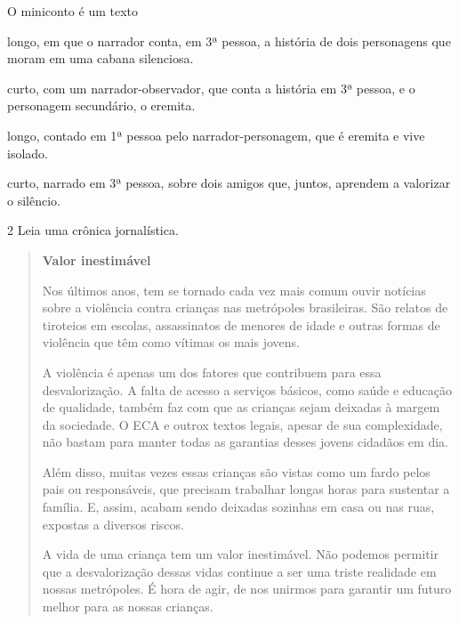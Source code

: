 O miniconto é um texto

\begin{escolha}
\item longo, em que o narrador conta, em 3ª pessoa, a história de dois
personagens que moram em uma cabana silenciosa.

\item curto, com um narrador-observador, que conta a história em 3ª
pessoa, e o personagem secundário, o eremita.

\item longo, contado em 1ª pessoa pelo narrador-personagem, que é eremita
e vive isolado.

\item curto, narrado em 3ª pessoa, sobre dois amigos que, juntos, aprendem
a valorizar o silêncio.
\end{escolha}


\num{2} Leia uma crônica jornalística.

\begin{quote}
\textbf{Valor inestimável}


Nos últimos anos, tem se tornado cada vez mais comum ouvir notícias
sobre a violência contra crianças nas metrópoles brasileiras. São
relatos de tiroteios em escolas, assassinatos de menores de idade e
outras formas de violência que têm como vítimas os mais jovens.

A violência é apenas um dos fatores que contribuem para essa
desvalorização. A falta de acesso a serviços básicos, como saúde e
educação de qualidade, também faz com que as crianças sejam deixadas à
margem da sociedade. O ECA e outrox textos legais, apesar de sua
complexidade, não bastam para manter todas as garantias desses jovens
cidadãos em dia.

Além disso, muitas vezes essas crianças são vistas como um fardo pelos
pais ou responsáveis, que precisam trabalhar longas horas para sustentar
a família. E, assim, acabam sendo deixadas sozinhas em casa ou nas ruas,
expostas a diversos riscos.

A vida de uma criança tem um valor inestimável. Não podemos permitir que
a desvalorização dessas vidas continue a ser uma triste realidade em
nossas metrópoles. É hora de agir, de nos unirmos para garantir um
futuro melhor para as nossas crianças.

\end{quote}

